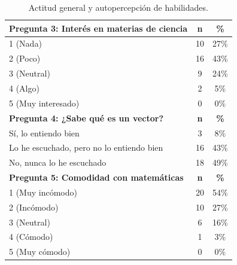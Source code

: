 \documentclass[10pt,a4paper]{article}
\begin{document}
\begin{table}[h!]
\centering
\caption{Actitud general y autopercepción de habilidades.}
\begin{tabular}{|l|c|c|}
\hline
\textbf{Pregunta 3: Interés en materias de ciencia} & \textbf{n} & \textbf{\%} \\
\hline
1 (Nada) & 10 & 27\% \\
2 (Poco) & 16 & 43\% \\
3 (Neutral) & 9 & 24\% \\
4 (Algo) & 2 & 5\% \\
5 (Muy interesado) & 0 & 0\% \\
\hline
\textbf{Pregunta 4: ¿Sabe qué es un vector?} & \textbf{n} & \textbf{\%} \\
\hline
Sí, lo entiendo bien & 3 & 8\% \\
Lo he escuchado, pero no lo entiendo bien & 16 & 43\% \\
No, nunca lo he escuchado & 18 & 49\% \\
\hline
\textbf{Pregunta 5: Comodidad con matemáticas} & \textbf{n} & \textbf{\%} \\
\hline
1 (Muy incómodo) & 20 & 54\% \\
2 (Incómodo) & 10 & 27\% \\
3 (Neutral) & 6 & 16\% \\
4 (Cómodo) & 1 & 3\% \\
5 (Muy cómodo) & 0 & 0\% \\
\hline
\end{tabular}
\end{table}
\end{document}
